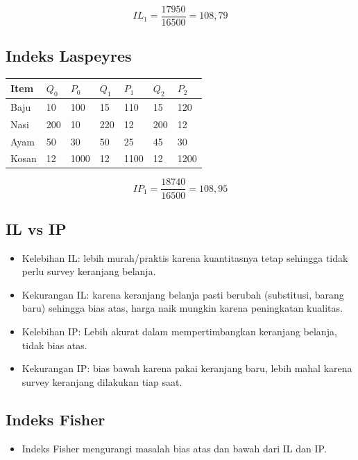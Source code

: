 \documentclass[
  letterpaper,
  DIV=11,
  numbers=noendperiod]{scrartcl}
\providecommand{\tightlist}{%
  \setlength{\itemsep}{0pt}\setlength{\parskip}{0pt}}\usepackage{longtable,booktabs,array}
\begin{document}
\[
IL_1=\frac{17950}{16500}=108,79
\]

\subsection{Indeks Laspeyres}\label{indeks-laspeyres-2}

\begin{longtable}[]{@{}lllllll@{}}
\toprule\noalign{}
Item & \(Q_0\) & \(P_0\) & \(Q_1\) & \(P_1\) & \(Q_2\) & \(P_2\) \\
\midrule\noalign{}
\endhead
\bottomrule\noalign{}
\endlastfoot
Baju & 10 & 100 & 15 & 110 & 15 & 120 \\
Nasi & 200 & 10 & 220 & 12 & 200 & 12 \\
Ayam & 50 & 30 & 50 & 25 & 45 & 30 \\
Kosan & 12 & 1000 & 12 & 1100 & 12 & 1200 \\
\end{longtable}

\[
IP_1=\frac{18740}{16500}=108,95
\]

\subsection{IL vs IP}\label{il-vs-ip}

\begin{itemize}
\item
  Kelebihan IL: lebih murah/praktis karena kuantitasnya tetap sehingga
  tidak perlu survey keranjang belanja.
\item
  Kekurangan IL: karena keranjang belanja pasti berubah (substitusi,
  barang baru) sehingga bias atas, harga naik mungkin karena peningkatan
  kualitas.
\item
  Kelebihan IP: Lebih akurat dalam mempertimbangkan keranjang belanja,
  tidak bias atas.
\item
  Kekurangan IP: bias bawah karena pakai keranjang baru, lebih mahal
  karena survey keranjang dilakukan tiap saat.
\end{itemize}

\subsection{Indeks Fisher}\label{indeks-fisher}

\begin{itemize}
\tightlist
\item
  Indeks Fisher mengurangi masalah bias atas dan bawah dari IL dan IP.
\end{itemize}
\end{document}
